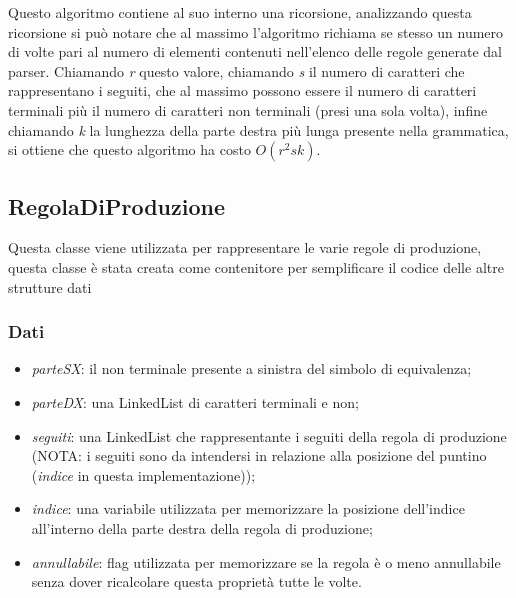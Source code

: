 \documentclass[12pt]{article}
\begin{document}
\label{COSTOINIZI}
Questo algoritmo contiene al suo interno una ricorsione, analizzando questa ricorsione si può notare che al massimo l'algoritmo richiama se stesso un numero di volte pari al numero di elementi contenuti nell'elenco delle regole generate dal parser.
Chiamando \textit{r} questo valore, chiamando \textit{s} il numero di caratteri che rappresentano i seguiti, che al massimo possono essere il numero di caratteri terminali più il numero di caratteri non terminali (presi una sola volta), infine chiamando \textit{k} la lunghezza della parte destra più lunga presente nella grammatica, si ottiene che questo algoritmo ha costo $O(r^2 s k)$.


\subsection{RegolaDiProduzione}
Questa classe viene utilizzata per rappresentare le varie regole di produzione, questa classe è stata creata come contenitore per semplificare il codice delle altre strutture dati
\subsubsection{Dati}
\begin{itemize}
\item\textit{parteSX}: il non terminale presente a sinistra del simbolo di equivalenza;
\item\textit{parteDX}: una LinkedList di caratteri terminali e non;
\item\textit{seguiti}: una LinkedList che rappresentante i seguiti della regola di produzione (NOTA: i seguiti sono da intendersi in relazione alla posizione del puntino (\textit{indice} in questa implementazione));
\item\textit{indice}: una variabile utilizzata per memorizzare la posizione dell'indice all'interno della parte destra della regola di produzione;
\item\textit{annullabile}: flag utilizzata per memorizzare se la regola è o meno annullabile senza dover ricalcolare questa proprietà tutte le volte.
\end{itemize}
\end{document}

